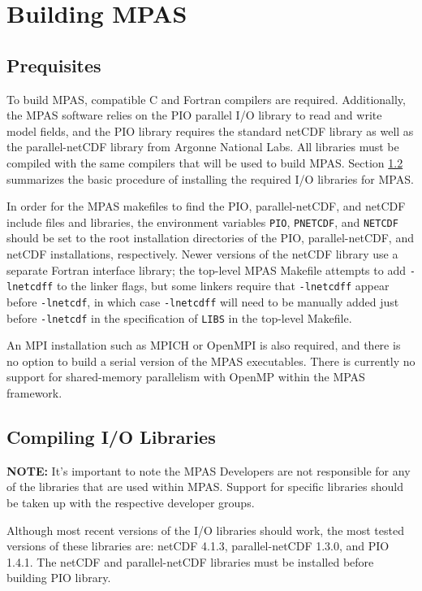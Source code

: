 \chapter{Building MPAS}

\section{Prequisites}

To build MPAS, compatible C and Fortran compilers are required. Additionally, the MPAS software relies on the PIO parallel I/O library to read and write model fields, and the PIO library requires the standard netCDF library as well as the parallel-netCDF library from Argonne National Labs. All libraries must be compiled with the same compilers that will be used to build MPAS. Section \ref{sec:build_io} summarizes the basic procedure of installing the required I/O libraries for MPAS.

In order for the MPAS makefiles to find the PIO, parallel-netCDF, and netCDF include files and libraries, the environment variables {\tt PIO}, {\tt PNETCDF}, and {\tt NETCDF} should be set to the root installation directories of the PIO, parallel-netCDF, and netCDF installations, respectively. Newer versions of the netCDF library use a separate Fortran interface library; the top-level MPAS Makefile attempts to add {\tt -lnetcdff} to the linker flags, but some linkers require that {\tt -lnetcdff} appear before {\tt -lnetcdf}, in which case {\tt -lnetcdff} will need to be manually added just before {\tt -lnetcdf} in the specification of {\tt LIBS} in the top-level Makefile.

An MPI installation such as MPICH or OpenMPI is also required, and there is no option to build a serial version of the MPAS executables. There is currently no support for shared-memory parallelism with OpenMP within the MPAS framework.


\section{Compiling I/O Libraries}
\label{sec:build_io}

{\bf NOTE:} It's important to note the MPAS Developers are not responsible for any of the libraries that are used within MPAS. Support for specific libraries should be taken up with the respective developer groups.

Although most recent versions of the I/O libraries should work, the most tested versions of these libraries are: netCDF 4.1.3, parallel-netCDF 1.3.0, and PIO 1.4.1. The netCDF and parallel-netCDF libraries must be installed before building PIO library.

